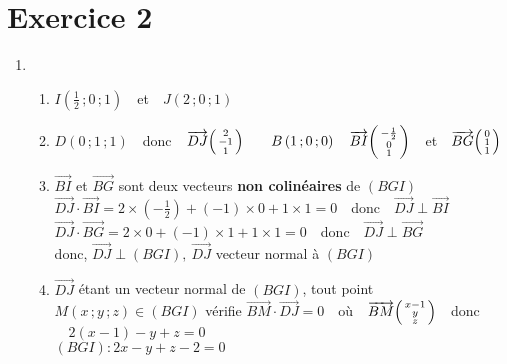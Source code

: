 \documentclass{scrartcl}
\begin{document}
    \section*{Exercice 2}
    \begin{adjustwidth}{2em}{0pt}
        \begin{enumerate}
            \item \begin{enumerate}[label=\alph*)]
                \item   $I\left(\frac{1}{2}\,;0\,;1\right)\quad$et$\quad J\left(2\,;0\,;1\right)$
                \item   $D\left(0\,;1\,;1\right)\quad$donc$\quad\overrightarrow{DJ}\begin{psmallmatrix}2 \\ -1 \\ 1\end{psmallmatrix}\qquad B\left(1\,;0\,;0\right)\quad\overrightarrow{BI}\begin{psmallmatrix}-\frac{1}{2} \\ 0 \\ 1\end{psmallmatrix}\quad$et$\quad\overrightarrow{BG}\begin{psmallmatrix}0 \\ 1 \\ 1\end{psmallmatrix}$
                \item   $\overrightarrow{BI}$ et $\overrightarrow{BG}$ sont deux vecteurs \textbf{non colinéaires} de $(BGI)$ \\ $\overrightarrow{DJ}\cdot\overrightarrow{BI}=2\times\left(-\frac{1}{2}\right)+\left(-1\right)\times 0+1\times 1=0\quad$donc$\quad\overrightarrow{DJ}\perp\overrightarrow{BI}$ \\ $\overrightarrow{DJ}\cdot\overrightarrow{BG}=2\times 0+(-1)\times 1+1\times 1=0\quad$donc$\quad \overrightarrow{DJ}\perp\overrightarrow{BG}$ \\ donc, $\overrightarrow{DJ}\perp(BGI),\ \overrightarrow{DJ}$ vecteur normal à $(BGI)$
                \item   $\overrightarrow{DJ}$ étant un vecteur normal de $(BGI)$, tout point $M(x\,;y\,;z)\in(BGI)$ vérifie \linebreak $\overrightarrow{BM}\cdot\overrightarrow{DJ}=0\quad$où$\quad\overrightarrow{BM}\begin{psmallmatrix}x-1 \\ y \\ z\end{psmallmatrix}\quad$donc$\quad 2(x-1)-y+z=0$ \\ $(BGI):2x-y+z-2=0$ 

\end{enumerate}
\end{enumerate}
\end{adjustwidth}
\end{document}
